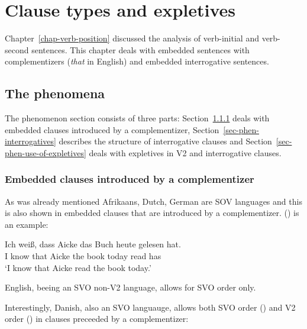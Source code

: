 \chapter{Clause types and expletives}
\label{chap-expletives}


Chapter~\ref{chap-verb-position} discussed the analysis of verb-initial and verb-second sentences. This chapter deals
with embedded sentences with complementizers (\eg \emph{that} in English) and embedded interrogative
sentences. 


\section{The phenomena}


The phenomenon section consists of three parts: Section~\ref{sec-complementizer} deals with embedded
clauses introduced by a complementizer, Section~\ref{sec-phen-interrogatives} describes the
structure of interrogative clauses and Section~\ref{sec-phen-use-of-expletives} deals with expletives in V2 and interrogative clauses.


\subsection{Embedded clauses introduced by a complementizer}
\label{sec-complementizer}

As was already mentioned Afrikaans, Dutch, German are SOV languages and this is also shown in embedded
clauses that are introduced by a complementizer. () is an example:

\ea
\gll Ich weiß, dass Aicke das Buch heute gelesen hat.\\
     I know that Aicke the book today read has\\\german
\glt `I know that Aicke read the book today.'
\z



English, beeing an SVO non-V2 language, allows for SVO order only.
\z
{}

Interestingly, Danish, also an SVO languauge, allows both SVO order () and V2 order () in clauses
preceeded by a complementizer:
\z


